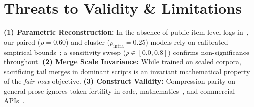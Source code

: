 
\section{Threats to Validity \& Limitations}
\label{sec:limitations}

\textbf{(1) Parametric Reconstruction:} In the absence of public item-level logs in~\cite{foroutan2026parity}, our paired ($\rho=0.60$) and cluster ($\rho_{\mathrm{intra}}=0.25$) models rely on calibrated empirical bounds~\cite{miller2024adding,abadie2022when}; a sensitivity sweep ($\rho \in [0.0, 0.8]$) confirms non-significance throughout.
\textbf{(2) Merge Scale Invariance:} While trained on scaled corpora, sacrificing tail merges in dominant scripts is an invariant mathematical property of the \textit{fair-max} objective.
\textbf{(3) Construct Validity:} Compression parity on general prose ignores token fertility in code, mathematics~\cite{singh2024tokenization}, and commercial APIs~\cite{ahia2023all}.
